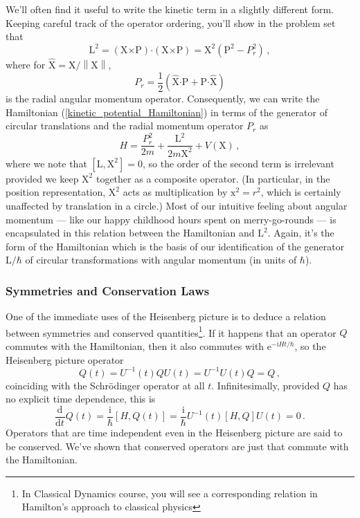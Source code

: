 \documentclass{article}
\theoremstyle{plain}\theoremheaderfont{\normalfont\itshape}\theorembodyfont{\rmfamily}\theoremseparator{.}\newtheorem*{rem}{Remark}\newtheorem*{ex}{Example}\newtheorem*{proof}{Proof}\newtheorem*{altp}{Alternative proof}
\theoremstyle{plain}\theoremheaderfont{\normalfont\bfseries}\theorembodyfont{\rmfamily}\theoremseparator{.}\newtheorem{thm}{Theorem}[section]\newtheorem{lem}[thm]{Lemma}\newtheorem{prop}[thm]{Proposition}\newtheorem*{cor}{Corollary}\newtheorem{defn}[thm]{Definition}\newtheorem{clm}[thm]{Claim}\newtheorem{clminproof}{Claim}
\theoremstyle{break}\theoremheaderfont{\normalfont\itshape}\theorembodyfont{\rmfamily}\theoremseparator{.\medskip}\newtheorem*{proofskip}{Proof}\newtheorem*{exs}{Examples}\newtheorem*{rems}{Remarks}
\theoremstyle{break}\theoremheaderfont{\normalfont\bfseries}\theorembodyfont{\rmfamily}\theoremseparator{.\medskip}\newtheorem{lemskip}[thm]{Lemma}\newtheorem{defnskip}[thm]{Definition}\newtheorem{propskip}[thm]{Proposition}\newtheorem{thmskip}[thm]{Theorem}
\numberwithin{equation}{section}
\newcommand{\ii}{\mathrm{i}}
\newcommand{\ee}{\mathrm{e}}
\newcommand{\dv}[3][]{\frac{\mathrm{d}^{#1} #2}{{\mathrm{d} #3}^{#1}}}
\newcommand{\vb}[1]{\bm{\mathrm{#1}}}
\newcommand{\vu}[1]{\hat{\bm{\mathrm{#1}}}}
\newcommand{\cross}{\bm{\times}}
\newcommand{\vdot}{\bm{\cdot}}
\newcommand{\norm}[1]{\left\| #1 \right\|}
\begin{document}
    We'll often find it useful to write the kinetic term in a slightly different form. Keeping careful track of the operator ordering, you'll show in the problem set that
    \begin{equation}
        \vb{L}^2=(\vb{X}\cross\vb{P})\vdot(\vb{X}\cross\vb{P})=\vb{X}^2(\vb{P}^2-P_r^2)\,,
    \end{equation}
    where for \(\vu{X}=\vb{X}/\norm{\vb{X}}\),
    \begin{equation}
        P_r=\frac{1}{2}\left(\vu{X}\vdot\vb{P}+\vb{P}\vdot\vu{X}\right)
    \end{equation}
    is the radial angular momentum operator. Consequently, we can write the Hamiltonian (\ref{kinetic_potential_Hamiltonian}) in terms of the generator of circular translations and the radial momentum operator \(P_r\) as
    \begin{equation}
        H=\frac{P_r^2}{2m}+\frac{\vb{L}^2}{2m\vb{X}^2}+V(\vb{X})\,,
    \end{equation}
    where we note that \([\vb{L},\vb{X}^2]=0\), so the order of the second term is irrelevant provided we keep \(\vb{X}^2\) together as a composite operator. (In particular, in the position representation, \(\vb{X}^2\) acts as multiplication by \(\vb{x}^2=r^2\), which is certainly unaffected by translation in a circle.) Most of our intuitive feeling about angular momentum --- like our happy childhood hours spent on merry-go-rounds --- is encapsulated in this relation between the Hamiltonian and \(\vb{L}^2\). Again, it's the form of the Hamiltonian which is the basis of our identification of the generator \(\vb{L}/\hbar\) of circular transformations with angular momentum (in units of \(\hbar\)). 

    \subsubsection{Symmetries and Conservation Laws}
    One of the immediate uses of the Heisenberg picture is to deduce a relation between symmetries and conserved quantities\footnote{In Classical Dynamics course, you will see a corresponding relation in Hamilton's approach to classical physics}. If it happens that an operator \(Q\) commutes with the Hamiltonian, then it also commutes with \(\ee^{-\ii Ht/\hbar}\), so the Heisenberg picture operator
    \begin{equation}
        Q(t)=U^{-1}(t)QU(t)=U^{-1}U(t)Q=Q\,,
    \end{equation}
    coinciding with the Schr\"{o}dinger operator at all \(t\). Infinitesimally, provided \(Q\) has no explicit time dependence, this is
    \begin{equation}\label{conversed_operator}
        \dv{}{t}Q(t)=\frac{\ii}{\hbar}[H,Q(t)]=\frac{\ii}{\hbar}U^{-1}(t)[H,Q]U(t)=0\,.
    \end{equation}
    Operators that are time independent even in the Heisenberg picture are said to be conserved. We've shown that conserved operators are just that commute with the Hamiltonian.
\end{document}
